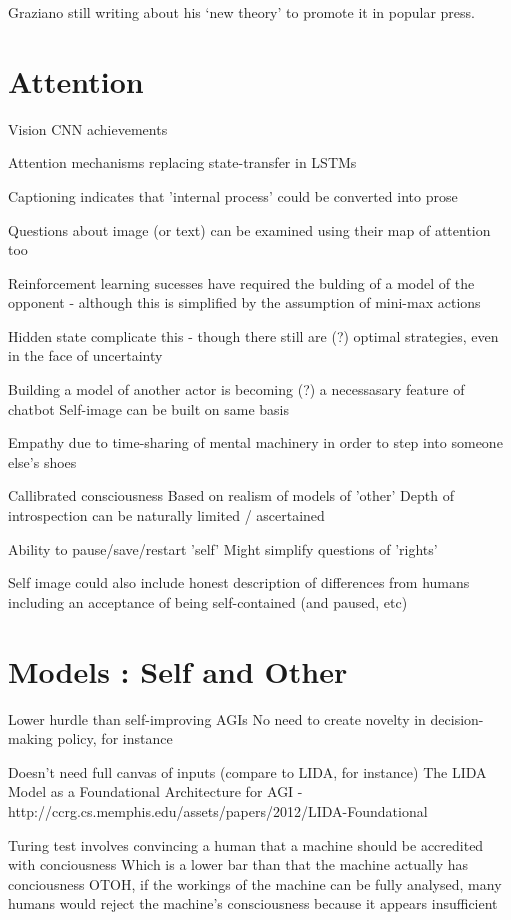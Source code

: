 \documentclass[citeauthoryear]{llncs}
\begin{document}
Graziano still writing about his `new theory' to promote it in popular press.


\section{Attention}

Vision CNN achievements

Attention mechanisms replacing state-transfer in LSTMs

Captioning indicates that 'internal process' could be converted into prose

Questions about image (or text) can be examined using their map of attention too


Reinforcement learning sucesses have required the bulding of a model
of the opponent - although this is simplified by the assumption of mini-max actions

  Hidden state complicate this - though there still are (?) optimal strategies, even in the face of uncertainty


Building a model of another actor is becoming (?) a necessasary feature of chatbot 
Self-image can be built on same basis


Empathy due to time-sharing of mental machinery in order to step into someone else's shoes


Callibrated consciousness
  Based on realism of models of 'other'
  Depth of introspection can be naturally limited / ascertained
  
  Ability to pause/save/restart 'self'
  Might simplify questions of 'rights'


Self image could also include honest description of differences from humans
  including an acceptance of being self-contained (and paused, etc)


\section{Models : Self and Other}


Lower hurdle than self-improving AGIs
  No need to create novelty in decision-making policy, for instance
  
Doesn't need full canvas of inputs (compare to LIDA, for instance)
  The LIDA Model as a Foundational Architecture for AGI - http://ccrg.cs.memphis.edu/assets/papers/2012/LIDA-Foundational%



Turing test involves convincing a human that a machine should be accredited with conciousness
  Which is a lower bar than that the machine actually has conciousness
  OTOH, if the workings of the machine can be fully analysed, many humans would reject the machine's consciousness because it appears insufficient
\end{document}
